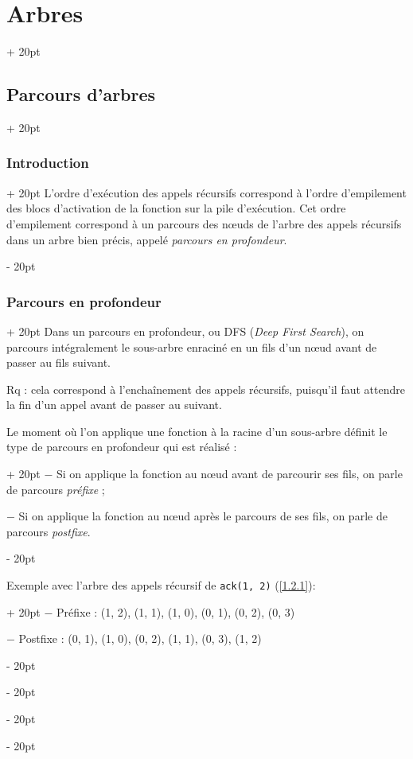 \documentclass[a4paper, 12pt, twoside]{article}
\newcommand{\ind}[1][20pt]{\advance\leftskip + #1}
\newcommand{\deind}[1][20pt]{\advance\leftskip - #1}
\newenvironment{indt}[2][20pt]{#2 \par \ind[#1]}{\par \deind} %
\begin{document}
\begin{indt}{\section{Arbres}}
\begin{indt}{\subsection{Parcours d'arbres}}
\begin{indt}{\subsubsection{Introduction}}
                L'ordre d'exécution des appels récursifs correspond à l'ordre d'empilement des blocs d'activation de la fonction sur la pile d'exécution.
                Cet ordre d'empilement correspond à un parcours des n\oe uds de l'arbre des appels récursifs dans un arbre bien précis, appelé \textit{parcours en profondeur}.
            \end{indt}
            
            \vspace{12pt}
            
            \begin{indt}{\subsubsection{Parcours en profondeur}}
                Dans un parcours en profondeur, ou DFS (\textit{Deep First Search}), on parcours intégralement le sous-arbre enraciné en un fils d'un n\oe ud avant de passer au fils suivant.
                
                \vspace{6pt}
                
                Rq : cela correspond à l'enchaînement des appels récursifs, puisqu'il faut attendre la fin d'un appel avant de passer au suivant.
                
                \begin{indt}{Le moment où l'on applique une fonction à la racine d'un sous-arbre définit le type de parcours en profondeur qui est réalisé :}
                    $-$ Si on applique la fonction au n\oe ud avant de parcourir ses fils, on parle de parcours \textit{préfixe} ;
                    
                    $-$ Si on applique la fonction au n\oe ud après le parcours de ses fils, on parle de parcours \textit{postfixe}.
                \end{indt}
                
                \vspace{6pt}
                
                \begin{indt}{Exemple avec l'arbre des appels récursif de \texttt{ack(1, 2)} (\ref{1.2.1}):}
                    $-$ Préfixe : (1, 2), (1, 1), (1, 0), (0, 1), (0, 2), (0, 3)
                    
                    $-$ Postfixe : (0, 1), (1, 0), (0, 2), (1, 1), (0, 3), (1, 2)
                \end{indt}
                

\end{indt}
\end{indt}
\end{indt}
\end{document}
